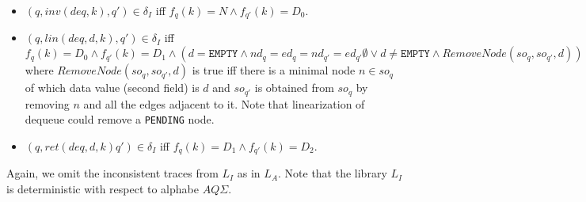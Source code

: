 \begin{itemize}
\begin{itemize}
\item $(q, inv(deq,k), q') \in \delta_I$ iff $f_q(k) = N \wedge f_{q'}(k) = D_0$.
\item $(q, lin(deq,d,k), q') \in \delta_I$ iff $f_q(k) = D_0 \wedge f_{q'}(k) = D_1 \wedge (d = \texttt{EMPTY} \wedge nd_q = ed_q = nd_{q'} = ed_{q'} \emptyset \vee d \neq \texttt{EMPTY} \wedge RemoveNode(so_q, so_{q'},d))$ where $RemoveNode(so_q, so_{q'},d)$ is true iff there is a minimal node $n \in so_q$ of which data value (second field) is $d$ and $so_{q'}$ is obtained from $so_q$ by removing $n$ and all the edges adjacent to it. Note that linearization of dequeue could remove a \texttt{PENDING} node.  
\item $(q, ret(deq,d,k) q') \in \delta_I$ iff $f_q(k) = D_1 \wedge f_{q'}(k) = D_2$.
\end{itemize}
\end{itemize}
Again, we omit the inconsistent traces from $L_I$ as in $L_A$. Note that the library $L_I$ is deterministic with respect to alphabe $AQ\Sigma$.

